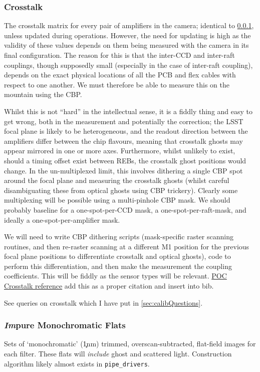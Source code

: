 \subsubsection{Crosstalk}\label{calibProducts:crosstalk}
The crosstalk matrix for every pair of amplifiers in the camera; identical to \secsymbol\ref{calibProducts:crosstalk}, unless updated during operations. However, the need for updating is high as the validity of these values depends on them being measured with the camera in its final configuration. The reason for this is that the inter-CCD and inter-raft couplings, though supposedly small (especially in the case of inter-raft coupling), depends on the exact physical locations of all the PCB and flex cables with respect to one another. We must therefore be able to measure this on the mountain using the CBP.

Whilst this is not ``hard'' in the intellectual sense, it is a fiddly thing and easy to get wrong, both in the measurement and potentially the correction; the LSST focal plane is likely to be heterogeneous, and the readout direction between the amplifiers differ between the chip flavours, meaning that crosstalk ghosts may appear mirrored in one or more axes. Furthermore, whilst unlikely to exist, should a timing offset exist between REBs, the crosstalk ghost positions would change.
\alg In the un-multiplexed limit, this involves dithering a single CBP spot around the focal plane and measuring the crosstalk ghosts (whilst careful disambiguating these from optical ghosts using CBP trickery). Clearly some multiplexing will be possible using a multi-pinhole CBP mask. We should probably baseline for a one-spot-per-CCD mask, a one-spot-per-raft-mask, and ideally a one-spot-per-amplifier mask.

We will need to write CBP dithering scripts (mask-specific raster scanning routines, and then re-raster scanning at a different M1 position for the previous focal plane positions to differentiate crosstalk and optical ghosts), code to perform this differentiation, and then make the measurement the coupling coefficients. This will be fiddly as the sensor types will be relevant. \hyperref{http://iopscience.iop.org/article/10.1088/1748-0221/10/05/C05010}{}{}{POC Crosstalk reference} \xxx add this as a proper citation and insert into bib.
\begin{note}
	See queries on crosstalk which I have put in \secsymbol\ref{sec:calibQuestions}.
\end{note}


\subsubsection{\emph{Im}pure Monochromatic Flats}\label{calibProducts:monoFlat}
Sets of `monochromatic' (\c 1nm) trimmed, overscan-subtracted, flat-field images for each filter. These flats will \textit{include} ghost and scattered light.
\alg Construction algorithm likely almost exists in \texttt{pipe\_drivers}.


